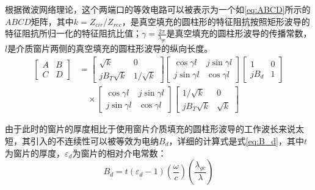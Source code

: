 \documentclass[master]{thesis-uestc}
\begin{document}
根据微波网络理论，这个两端口的等效电路可以被表示为一个如\ref{eq:ABCD}所示的$ABCD$矩阵，其中$k=Z_{cir}/Z_{rec}$，是真空填充的圆柱形的特征阻抗按照矩形波导的特征阻抗所归一化的特征阻抗比值；$\gamma=\frac{2 \pi}{\lambda_{gc}}$是真空填充的圆柱形波导的传播常数，$l$是介质窗片两侧的真空填充的圆柱形波导的纵向长度。
\begin{equation}\label{eq:ABCD}
    \begin{split}
        \begin{bmatrix}
            A & B \\
            C & D
        \end{bmatrix} 
        & = 
        \begin{bmatrix}
            \sqrt{k} & 0 \\
            jB_{T}\sqrt{k} & 1/\sqrt{k}
        \end{bmatrix}
        \begin{bmatrix}
            \cos{\gamma l} & j\sin{\gamma l} \\
            j\sin{\gamma l} & \cos{\gamma l}
        \end{bmatrix}
        \begin{bmatrix}
            1 & 0 \\
            jB_{d} & 1
        \end{bmatrix} \\
        & \quad \times 
        \begin{bmatrix}
            \cos{\gamma l} & j\sin{\gamma l} \\
            j\sin{\gamma l} & \cos{\gamma l}
        \end{bmatrix}
        \begin{bmatrix}
            1/\sqrt{k} & 0 \\
            jB_{T}\sqrt{k} & \sqrt{k}
        \end{bmatrix}
    \end{split}
\end{equation}

由于此时的窗片的厚度相比于使用窗片介质填充的圆柱形波导的工作波长来说太短，其引入的不连续性可以被等效为电纳$B_{d}$，详细的计算式是式\ref{eq:B_d}，其中$t$为窗片的厚度，$\varepsilon_d$为窗片的相对介电常数：
\begin{equation}\label{eq:B_d}
    B_{d} = t (\varepsilon_d - 1) \left( \frac{\omega}{c} \right) \left( \frac{\lambda_{gc}}{\lambda} \right)
\end{equation}
\end{document}

